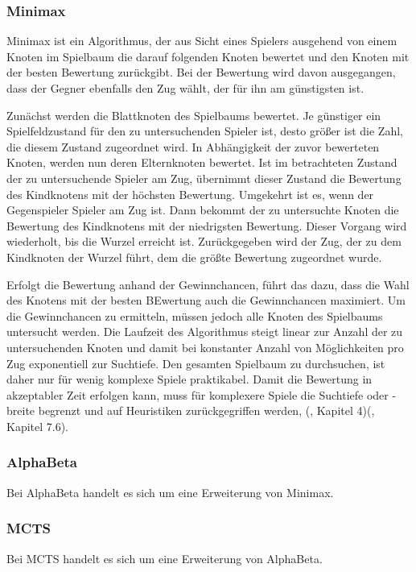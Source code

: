 \subsubsection{Minimax}

Minimax ist ein Algorithmus, der aus Sicht eines Spielers ausgehend von einem Knoten im Spielbaum die darauf folgenden Knoten bewertet und den Knoten mit der besten Bewertung zurückgibt. Bei der Bewertung wird davon ausgegangen, dass der Gegner ebenfalls den Zug wählt, der für ihn am günstigsten ist.

Zunächst werden die Blattknoten des Spielbaums bewertet. Je günstiger ein Spielfeldzustand für den zu untersuchenden Spieler ist, desto größer ist die Zahl, die diesem Zustand zugeordnet wird. In Abhängigkeit der zuvor bewerteten Knoten, werden nun deren Elternknoten bewertet. Ist im betrachteten Zustand der zu untersuchende Spieler am Zug, übernimmt dieser Zustand die Bewertung des Kindknotens mit der höchsten Bewertung. Umgekehrt ist es, wenn der Gegenspieler Spieler am Zug ist. Dann bekommt der zu untersuchte Knoten die Bewertung des Kindknotens mit der niedrigsten Bewertung. Dieser Vorgang wird wiederholt, bis die Wurzel erreicht ist. Zurückgegeben wird der Zug, der zu dem Kindknoten der Wurzel führt, dem die größte Bewertung zugeordnet wurde.

Erfolgt die Bewertung anhand der Gewinnchancen, führt das dazu, dass die Wahl des Knotens mit der besten BEwertung auch die Gewinnchancen maximiert. Um die Gewinnchancen zu ermitteln, müssen jedoch alle Knoten des Spielbaums untersucht werden. Die Laufzeit des Algorithmus steigt linear zur Anzahl der zu untersuchenden Knoten und damit bei konstanter Anzahl von Möglichkeiten pro Zug exponentiell zur Suchtiefe. Den gesamten Spielbaum zu durchsuchen, ist daher nur für wenig komplexe Spiele praktikabel. Damit die Bewertung in akzeptabler Zeit erfolgen kann, muss für komplexere Spiele die Suchtiefe oder -breite begrenzt und auf Heuristiken zurückgegriffen werden, (\cite{Ferguson.January2019}, Kapitel 4)(\cite{Heineman.October2008}, Kapitel 7.6).

\subsubsection{AlphaBeta}

Bei AlphaBeta handelt es sich um eine Erweiterung von Minimax.

\subsubsection{MCTS}

Bei MCTS handelt es sich um eine Erweiterung von AlphaBeta.